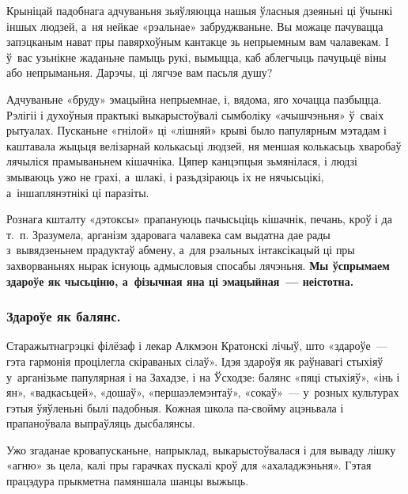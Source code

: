 Крыніцай падобнага адчуваньня зьяўляюцца нашыя ўласныя дзеяньні ці ўчынкі іншых людзей, а~ня нейкае «рэальнае» забруджваньне. Вы можаце пачувацца запэцканым нават пры павярхоўным кантакце зь непрыемным вам чалавекам. І ў~вас узьнікне жаданьне памыць рукі, вымыцца, каб аблегчыць пачуцьцё віны або непрыманьня. Дарэчы, ці лягчэе вам пасьля душу?


Адчуваньне «бруду» эмацыйна непрыемнае, і, вядома, яго хочацца пазбыцца. Рэлігіі і духоўныя практыкі выкарыстоўвалі сымболіку «ачышчэньня» ў~сваіх рытуалах. Пусканьне «гнілой» ці «лішняй» крыві было папулярным мэтадам і каштавала жыцьця велізарнай колькасьці людзей, ня меншая колькасьць хваробаў лячыліся прамываньнем кішачніка. Цяпер канцэпцыя зьмянілася, і людзі змываюць ужо не грахі, а~шлакі, і разьдзіраюць іх не нячысьцікі, а~іншаплянэтнікі ці паразіты.

Рознага кшталту «дэтоксы» прапануюць пачысьціць кішачнік, печань, кроў і да т.~п. Зразумела, арганізм здаровага чалавека сам выдатна дае рады з~вывядзеньнем прадуктаў абмену, а~для рэальных інтаксікацый ці пры захворваньнях нырак існуюць адмысловыя спосабы лячэньня. \textbf{Мы ўспрымаем здароўе як чысьціню, а~фізычная яна ці эмацыйная~--- неістотна.}

\subsubsection{Здароўе як балянс.} 

Старажытнагрэцкі філёзаф і лекар Алкмэон Кратонскі лічыў, што «здароўе~--- гэта гармонія процілегла скіраваных сілаў». Ідэя здароўя як раўнавагі стыхіяў у~арганізьме папулярная і на Захадзе, і на Ўсходзе: балянс «пяці стыхіяў», «інь і ян», «вадкасьцей», «дошаў», «першаэлемэнтаў», «сокаў»~--- у~розных культурах гэтыя ўяўленьні былі падобныя. Кожная школа па-свойму ацэньвала і прапаноўвала выпраўляць дысбалянсы.

Ужо згаданае кровапусканьне, напрыклад, выкарыстоўвалася і для вываду лішку «агню» зь цела, калі пры гарачках пускалі кроў для «ахаладжэньня». Гэтая працэдура прыкметна памяншала шанцы выжыць. 

